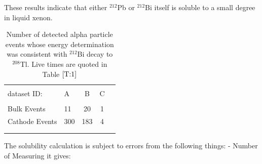 These results indicate that either $^{212}$Pb or $^{212}$Bi itself is soluble to a small degree in liquid xenon. 



\begin{table}[ht]
\centering
\caption{Number of detected alpha particle events whose energy determination was consistent with $^{212}$Bi decay to $^{208}$Tl. Live times are quoted in Table $\ref{T:1}$}
\begin{tabular}{llccc}
\hline
\\[-5pt]
dataset ID: & A &B & C \\
\hline
\\[-5pt]

Bulk Events & 11 & 20 & 1 \\
Cathode Events & 300 & 183 & 4 \\
\\[-5pt]

\\[-5pt]

\hline
\end{tabular}
\label{T:3}
\end{table}


The solubility calculation is subject to errors from the following things:
- Number of 
Measuring it gives:

